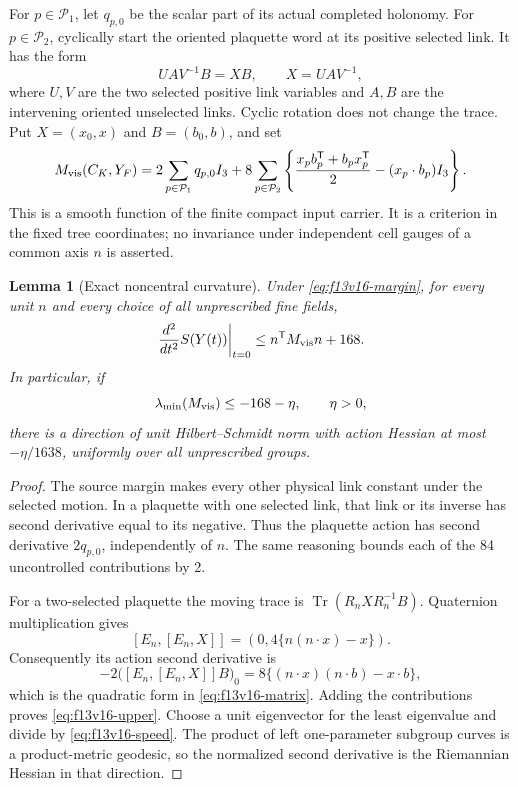 \documentclass[11pt,oneside]{article}
\newtheorem{lemma}[theorem]{Lemma}
\begin{document}
For \(p\in\mathcal P_1\), let \(q_{p,0}\) be the
scalar part of its actual completed holonomy.
For \(p\in\mathcal P_2\), cyclically start the
oriented plaquette word at its positive selected
link. It has the form
\[
                    U A V^{-1}B=X B,
                    \qquad X=UAV^{-1},
\]
where \(U,V\) are the two selected positive link
variables and \(A,B\) are the intervening oriented
unselected links. Cyclic rotation does not change
the trace. Put \(X=(x_0,x)\) and \(B=(b_0,b)\), and set
\begin{equation}\label{eq:f13v16-matrix}
 M_{\rm vis}(C_K,Y_F)
 =2\sum_{p\in\mathcal P_1}q_{p,0}I_3
   +8\sum_{p\in\mathcal P_2}
       \left\{\frac{x_pb_p^{\mathsf T}
                         +b_px_p^{\mathsf T}}2
                    -(x_p\cdot b_p)I_3\right\}.
\end{equation}
This is a smooth function of the finite compact
input carrier. It is a criterion in the fixed tree
coordinates; no invariance under independent
cell gauges of a common axis \(n\) is asserted.

\begin{lemma}[Exact noncentral curvature]
\label{lem:f13v16-matrix}
Under \eqref{eq:f13v16-margin}, for every unit \(n\)
and every choice of all unprescribed fine fields,
\begin{equation}\label{eq:f13v16-upper}
       \left.\frac{d^2}{dt^2}S(Y(t))\right|_{t=0}
                       \le n^{\mathsf T}M_{\rm vis}n+168.
\end{equation}
In particular, if
\begin{equation}\label{eq:f13v16-test}
                 \lambda_{\min}(M_{\rm vis})
                                  \le-168-\eta,\qquad\eta>0,
\end{equation}
there is a direction of unit Hilbert--Schmidt
norm with action Hessian at most \(-\eta/1638\),
uniformly over all unprescribed groups.
\end{lemma}

\begin{proof}
The source margin makes every other physical link
constant under the selected motion. In a plaquette
with one selected link, that link or its inverse has
second derivative equal to its negative. Thus the
plaquette action has second derivative \(2q_{p,0}\),
independently of \(n\). The same reasoning bounds
each of the 84 uncontrolled contributions by 2.

For a two-selected plaquette the moving trace is
\(\operatorname{Tr}(R_n X R_n^{-1}B)\).
Quaternion multiplication gives
\[
 [E_n,[E_n,X]]
            =(0,4\{n(n\cdot x)-x\}).
\]
Consequently its action second derivative is
\[
 -2\bigl([E_n,[E_n,X]]B\bigr)_0
       =8\{(n\cdot x)(n\cdot b)-x\cdot b\},
\]
which is the quadratic form in \eqref{eq:f13v16-matrix}.
Adding the contributions proves
\eqref{eq:f13v16-upper}. Choose a unit eigenvector
for the least eigenvalue and divide by
\eqref{eq:f13v16-speed}. The product of left
one-parameter subgroup curves is a product-metric
geodesic, so the normalized second derivative is
the Riemannian Hessian in that direction.
\end{proof}
\end{document}
